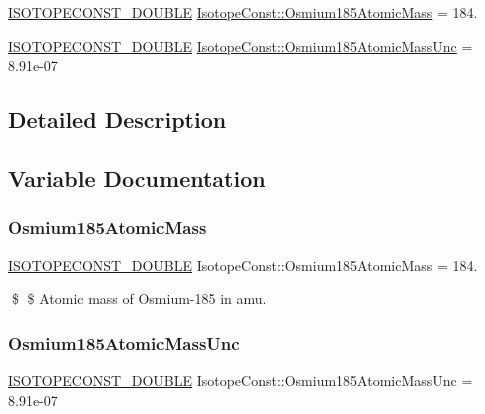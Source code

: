 \begin{DoxyCompactItemize}
\item 
\mbox{\hyperlink{group___isotope_const-_macros_ga8f45a7272ce02c0b4c65c44636ed719a}{I\+S\+O\+T\+O\+P\+E\+C\+O\+N\+S\+T\+\_\+\+D\+O\+U\+B\+LE}} \mbox{\hyperlink{group___isotope_const-_osmium-_os185_ga29eefaa4779c3793b73b48fdeb65d3dc}{Isotope\+Const\+::\+Osmium185\+Atomic\+Mass}} = 184.
\item 
\mbox{\hyperlink{group___isotope_const-_macros_ga8f45a7272ce02c0b4c65c44636ed719a}{I\+S\+O\+T\+O\+P\+E\+C\+O\+N\+S\+T\+\_\+\+D\+O\+U\+B\+LE}} \mbox{\hyperlink{group___isotope_const-_osmium-_os185_ga6a5927010ee1ca0da13e89466f30aad0}{Isotope\+Const\+::\+Osmium185\+Atomic\+Mass\+Unc}} = 8.\+91e-\/07
\end{DoxyCompactItemize}


\subsection{Detailed Description}


\subsection{Variable Documentation}
\mbox{\label{group___isotope_const-_osmium-_os185_ga29eefaa4779c3793b73b48fdeb65d3dc}} 
\subsubsection{\texorpdfstring{Osmium185\+Atomic\+Mass}{Osmium185AtomicMass}}
{\footnotesize\ttfamily \mbox{\hyperlink{group___isotope_const-_macros_ga8f45a7272ce02c0b4c65c44636ed719a}{I\+S\+O\+T\+O\+P\+E\+C\+O\+N\+S\+T\+\_\+\+D\+O\+U\+B\+LE}} Isotope\+Const\+::\+Osmium185\+Atomic\+Mass = 184.}

\$ \$ Atomic mass of Osmium-\/185 in amu. \mbox{\label{group___isotope_const-_osmium-_os185_ga6a5927010ee1ca0da13e89466f30aad0}} 
\subsubsection{\texorpdfstring{Osmium185\+Atomic\+Mass\+Unc}{Osmium185AtomicMassUnc}}
{\footnotesize\ttfamily \mbox{\hyperlink{group___isotope_const-_macros_ga8f45a7272ce02c0b4c65c44636ed719a}{I\+S\+O\+T\+O\+P\+E\+C\+O\+N\+S\+T\+\_\+\+D\+O\+U\+B\+LE}} Isotope\+Const\+::\+Osmium185\+Atomic\+Mass\+Unc = 8.\+91e-\/07}

